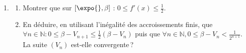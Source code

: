 \begin{exo}
\begin{description}
\begin{enumerate}
\begin{enumerate}
                                    \item En d\'eduire que $\beta \in [\expo{} , 3]$.
                                    \item Montrer par r\'ecurrence que : $\forall n \in \mathbb{N} , V_n \in [\expo{} , \beta ]$.
                              \end{enumerate}
                        \item \begin{enumerate}
                                    \item Montrer que sur $[\expo{} , \beta]$ : $0 \leq f'(x) \leq \frac{1}{2}$.
                                    \item En d\'eduire, en utilisant l'in\'egalit\'e des accroissements finis, que
                                          $\forall n \in \mathbb{N} : 0 \leq \beta - V_{n+1} \leq \frac{1}{2} (\beta - V_n)$
                                          puis que $\forall n \in \mathbb{N} , 0 \leq \beta - V_n < \frac{1}{2^{n+1}}$.
                                          La suite $(V_n)$ est-elle convergente\,?
                              \end{enumerate}
                  \end{enumerate}
      \end{description}
\end{exo}
